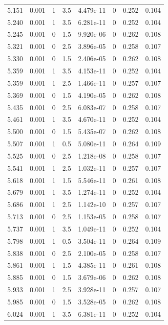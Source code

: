 \documentclass[preview]{standalone}
\begin{document}
{{{{\begin{tabular}{L{1.2cm}C{1.2cm} C{0.3cm}C{0.5cm} C{1.4cm}C{1.4cm} C{1.4cm}C{1.4cm}}
  5.151  &  0.001  & 1     & 3.5 &  4.479e-11  & 0  & 0.252 &  0.104   \\ 
  5.240  &  0.001  & 1     & 3.5 &  6.281e-11  & 0  & 0.252 &  0.104   \\ 
  5.245  &  0.001  & 0     & 1.5 &  9.920e-06  & 0  & 0.262 &  0.108   \\ 
  5.321  &  0.001  & 0     & 2.5 &  3.896e-05  & 0  & 0.258 &  0.107   \\ 
  5.330  &  0.001  & 0     & 1.5 &  2.406e-05  & 0  & 0.262 &  0.108   \\ 
  5.359  &  0.001  & 1     & 3.5 &  4.153e-11  & 0  & 0.252 &  0.104   \\ 
  5.359  &  0.001  & 1     & 2.5 &  1.466e-11  & 0  & 0.257 &  0.107   \\ 
  5.369  &  0.001  & 0     & 1.5 &  4.190e-05  & 0  & 0.262 &  0.108   \\ 
  5.435  &  0.001  & 0     & 2.5 &  6.083e-07  & 0  & 0.258 &  0.107   \\ 
  5.461  &  0.001  & 1     & 3.5 &  4.670e-11  & 0  & 0.252 &  0.104   \\ 
  5.500  &  0.001  & 0     & 1.5 &  5.435e-07  & 0  & 0.262 &  0.108   \\ 
  5.507  &  0.001  & 1     & 0.5 &  5.080e-11  & 0  & 0.264 &  0.109   \\ 
  5.525  &  0.001  & 0     & 2.5 &  1.218e-08  & 0  & 0.258 &  0.107   \\ 
  5.541  &  0.001  & 1     & 2.5 &  1.032e-11  & 0  & 0.257 &  0.107   \\ 
  5.618  &  0.001  & 1     & 1.5 &  5.546e-11  & 0  & 0.261 &  0.108   \\ 
  5.679  &  0.001  & 1     & 3.5 &  1.274e-11  & 0  & 0.252 &  0.104   \\ 
  5.686  &  0.001  & 1     & 2.5 &  1.142e-10  & 0  & 0.257 &  0.107   \\ 
  5.713  &  0.001  & 0     & 2.5 &  1.153e-05  & 0  & 0.258 &  0.107   \\ 
  5.737  &  0.001  & 1     & 3.5 &  1.049e-11  & 0  & 0.252 &  0.104   \\ 
  5.798  &  0.001  & 1     & 0.5 &  3.504e-11  & 0  & 0.264 &  0.109   \\ 
  5.838  &  0.001  & 0     & 2.5 &  2.100e-05  & 0  & 0.258 &  0.107   \\ 
  5.861  &  0.001  & 1     & 1.5 &  4.385e-11  & 0  & 0.261 &  0.108   \\ 
  5.885  &  0.001  & 0     & 1.5 &  3.679e-06  & 0  & 0.262 &  0.108   \\ 
  5.933  &  0.001  & 1     & 2.5 &  3.928e-11  & 0  & 0.257 &  0.107   \\ 
  5.985  &  0.001  & 0     & 1.5 &  3.528e-05  & 0  & 0.262 &  0.108   \\ 
  6.024  &  0.001  & 1     & 3.5 &  6.381e-11  & 0  & 0.252 &  0.104   \\ 
\hline 
\end{tabular} 

}}}}
\end{document}
